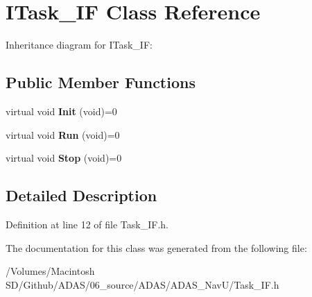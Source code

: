 \hypertarget{class_i_task___i_f}{}\section{I\+Task\+\_\+\+IF Class Reference}
\label{class_i_task___i_f}


Inheritance diagram for I\+Task\+\_\+\+IF\+:
\subsection*{Public Member Functions}
\begin{DoxyCompactItemize}
\item 
\mbox{\label{class_i_task___i_f_a28f608bdb9b19658403f7b9b7421968d}} 
virtual void {\bfseries Init} (void)=0
\item 
\mbox{\label{class_i_task___i_f_ab73cc5879a61d00fc59b72cce32cc6f7}} 
virtual void {\bfseries Run} (void)=0
\item 
\mbox{\label{class_i_task___i_f_af5f8fba86704c7e36d0e4681d58300c6}} 
virtual void {\bfseries Stop} (void)=0
\end{DoxyCompactItemize}


\subsection{Detailed Description}


Definition at line 12 of file Task\+\_\+\+I\+F.\+h.



The documentation for this class was generated from the following file\+:\begin{DoxyCompactItemize}
\item 
/\+Volumes/\+Macintosh S\+D/\+Github/\+A\+D\+A\+S/06\+\_\+source/\+A\+D\+A\+S/\+A\+D\+A\+S\+\_\+\+Nav\+U/Task\+\_\+\+I\+F.\+h\end{DoxyCompactItemize}
